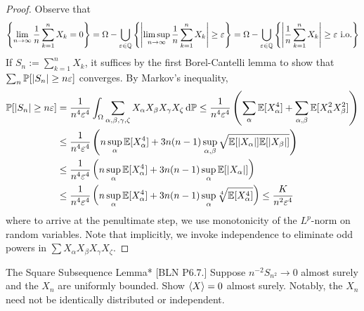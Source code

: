 \begin{proof}
    Observe that 
    \[
        \left\{ \lim_{n \to \infty} \frac{1}{n} \sum_{k=1}^n X_k = 0 \right\}
        = \Omega - \bigcup_{\varepsilon \in \mathbb{Q}} \left\{ \left| \limsup_{n \to \infty} \frac{1}{n} \sum_{k=1}^n X_k \right| \geq \varepsilon \right\}
        = \Omega - \bigcup_{\varepsilon \in \mathbb{Q}} \left\{ \left| \frac{1}{n} \sum_{k=1}^n X_k \right| \geq \varepsilon \text{ i.o.} \right\}
    \]
    If \(S_n := \sum_{k=1}^n X_k\), it suffices by the first Borel-Cantelli lemma to show that \(\sum_n \mathbb{P}[|S_n| \geq n \varepsilon]\) converges. By Markov's inequality, 
    \begin{align*}
        \mathbb{P}[|S_n| \geq n \varepsilon] 
        &= \frac{1}{n^4 \varepsilon^4} \int_{\Omega} \sum_{\alpha, \beta, \gamma, \zeta} X_\alpha X_\beta X_\gamma X_\zeta \, \mathrm{d}\mathbb{P} 
        \leq \frac{1}{n^4 \varepsilon^4} \left(\sum_\alpha \mathbb{E}[X_\alpha^4] + \sum_{\alpha, \beta} \mathbb{E}[X_\alpha^2 X_\beta^2] \right) \\
        &\leq \frac{1}{n^4 \varepsilon^4} \left(n \sup_\alpha \mathbb{E}[X_\alpha^4] + 3n(n-1) \sup_{\alpha, \beta} \sqrt{\mathbb{E}[|X_\alpha|] \mathbb{E}[|X_\beta|]} \right) \\
        &\leq \frac{1}{n^4 \varepsilon^4} \left(n \sup_\alpha \mathbb{E}[X_\alpha^4] + 3n(n-1) \sup_\alpha \mathbb{E}[|X_\alpha|] \right) \\
        &\leq \frac{1}{n^4 \varepsilon^4} \left(n \sup_\alpha \mathbb{E}[X_\alpha^4] + 3n(n-1) \sup_\alpha \sqrt[4]{\mathbb{E}[X_\alpha^4]} \right) 
        \leq \frac{K}{n^2 \varepsilon^4}
    \end{align*}
    where to arrive at the penultimate step, we use monotonicity of the \(L^p\)-norm on random variables. Note that implicitly, we invoke independence to eliminate odd powers in \(\sum X_\alpha X_\beta X_\gamma X_\zeta\). 
\end{proof}


\begin{problem}{The Square Subsequence Lemma}*
    [BLN P6.7.] Suppose \(n^{-2} S_{n^2} \to 0\) almost surely and the \(X_n\) are uniformly bounded. Show \(\ev{X} = 0\) almost surely. Notably, the \(X_n\) need not be identically distributed or independent. 
\end{problem}

